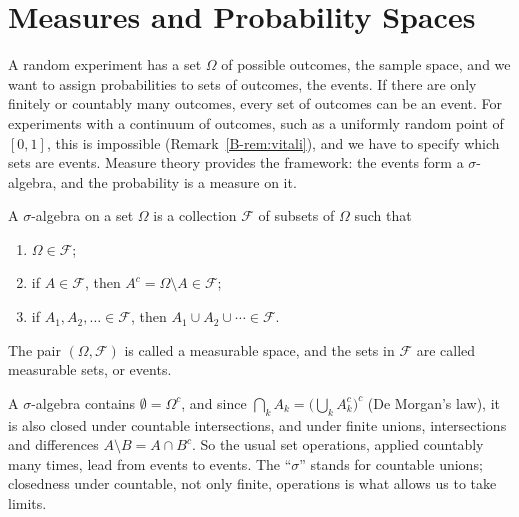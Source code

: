 \section{Measures and Probability Spaces}\label{B-sec:measures}

A random experiment has a set $\Omega$ of possible outcomes, the sample space, and we want to assign probabilities to sets of outcomes, the events. If there are only finitely or countably many outcomes, every set of outcomes can be an event. For experiments with a continuum of outcomes, such as a uniformly random point of $[0, 1]$, this is impossible (Remark~\ref{B-rem:vitali}), and we have to specify which sets are events. Measure theory provides the framework: the events form a $\sigma$-algebra, and the probability is a measure on it.

\begin{definition}\label{B-def:sigma-algebra}
    A $\sigma$-algebra on a set $\Omega$ is a collection $\mathcal{F}$ of subsets of $\Omega$ such that
    \begin{enumerate}
        \item $\Omega \in \mathcal{F}$;
        \item if $A \in \mathcal{F}$, then $A^c = \Omega \setminus A \in \mathcal{F}$;
        \item if $A_1, A_2, \ldots \in \mathcal{F}$, then $A_1 \cup A_2 \cup \cdots \in \mathcal{F}$.
    \end{enumerate}
    The pair $(\Omega, \mathcal{F})$ is called a measurable space, and the sets in $\mathcal{F}$ are called measurable sets, or events.
\end{definition}

A $\sigma$-algebra contains $\emptyset = \Omega^c$, and since $\bigcap_k A_k = \big(\bigcup_k A_k^c\big)^c$ (De Morgan's law), it is also closed under countable intersections, and under finite unions, intersections and differences $A \setminus B = A \cap B^c$. So the usual set operations, applied countably many times, lead from events to events. The ``$\sigma$'' stands for countable unions; closedness under countable, not only finite, operations is what allows us to take limits.

